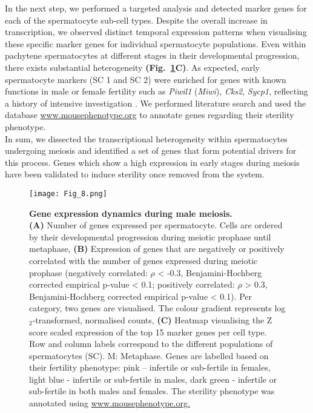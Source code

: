 In the next step, we performed a targeted analysis and detected marker genes for each of the spermatocyte sub-cell types. Despite the overall increase in transcription, we observed distinct temporal expression patterns when visualising these specific marker genes for individual spermatocyte populations. Even within pachytene spermatocytes at different stages in their developmental progression, there exists substantial heterogeneity \textbf{(Fig.~\ref{fig3:meiosis}C)}. As expected, early spermatocyte markers (SC 1 and SC 2) were enriched for genes with known functions in male or female fertility such as \textit{Piwil1} (\textit{Miwi}), \textit{Cks2}, \textit{Sycp1}, reflecting a history of intensive investigation \citep{Deng2002, Spruck2003, Vries2005}. We performed literature search and used the database \url{www.mousephenotype.org} to annotate genes regarding their sterility phenotype. \\

In sum, we dissected the transcriptional heterogeneity within spermatocytes undergoing meiosis and identified a set of genes that form potential drivers for this process. Genes which show a high expression in early stages during meiosis have been validated to induce sterility once removed from the system.  

\newpage

\begin{figure}[!h]
\centering
\texttt{[image: Fig\_8.png]}
\caption[Gene expression dynamics during male meiosis]{\textbf{Gene expression dynamics during male meiosis.} \\
\textbf{(A)} Number of genes expressed per spermatocyte. Cells are ordered by their developmental progression during meiotic prophase until metaphase, \textbf{(B)} Expression of genes that are negatively or positively correlated with the number of genes expressed during meiotic prophase (negatively correlated: $\rho$ < -0.3, Benjamini-Hochberg corrected empirical p-value < 0.1; positively correlated: $\rho$ > 0.3, Benjamini-Hochberg corrected empirical p-value < 0.1). Per category, two genes are visualised. The colour gradient represents log$_2$-transformed, normalised counts, \textbf{(C)} Heatmap visualising the Z score scaled expression of the top 15 marker genes per cell type. Row and column labels correspond to the different populations of spermatocytes (SC). M: Metaphase. Genes are labelled based on their fertility phenotype: pink – infertile or sub-fertile in females, light blue - infertile or sub-fertile in males, dark green - infertile or sub-fertile in both males and females. The sterility phenotype was annotated using \url{www.mousephenotype.org.}}
\label{fig3:meiosis}
\end{figure}

